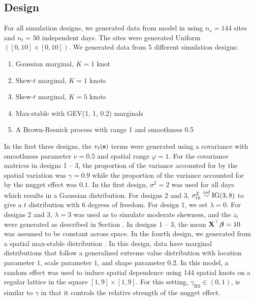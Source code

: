 \documentclass[useAMS,usenatbib,referee]{biom}
\begin{document}
\subsection{Design}\label{sts:simdesign}
For all simulation designs, we generated data from model  in  using $n_s=144$ sites and $n_t=50$ independent days.
The sites were generated Uniform$([0, 10] \times [0, 10])$.
We generated data from 5 different simulation designs:
\begin{enumerate}[leftmargin=3em]
  \item Gaussian marginal, $K=1$ knot
  \item Skew-$t$ marginal, $K=1$ knots
  \item Skew-$t$ marginal, $K=5$ knots
  \item Max-stable with GEV(1, 1, 0.2) marginals \citep{Reich2012}
  \item A Brown-Resnick process with range 1 and smoothness 0.5
\end{enumerate}
In the first three designs, the $v_t(\mbox{\bf s})$ terms were generated using a \Matern covariance with smoothness parameter $\nu = 0.5$ and spatial range $\varphi = 1$.
For the covariance matrices in designs 1 -- 3, the proportion of the variance accounted for by the spatial variation was $\gamma = 0.9$ while the proportion of the variance accounted for by the nugget effect was $0.1$.
In the first design, $\sigma^2 = 2$ was used for all days which results in a Gaussian distribution.
For designs 2 and 3, $\sigma^2_{tk} \stackrel{iid}{\sim} \text{IG}(3, 8)$ to give a $t$ distribution with 6 degrees of freedom.
For design 1, we set $\lambda = 0$.
For designs 2 and 3, $\lambda = 3$ was used as to simulate moderate skewness, and the $z_t$ were generated as described in Section .
In designs 1 -- 3, the mean $\mbox{\bf X}^\top \mbox{\boldmath $\beta$} = 10$ was assumed to be constant across space.
In the fourth design, we generated from a spatial max-stable distribution \citep{Reich2012}.
In this design, data have marginal distributions that follow a generalized extreme value distribution with location parameter $1$, scale parameter $1$, and shape parameter $0.2$.
In this model, a random effect was used to induce spatial dependence using 144 spatial knots on a regular lattice in the square $[1, 9] \times [1, 9]$.
For this setting, $\gamma_{\text{RS}} \in (0, 1)$, is similar to $\gamma$ in that it controls the relative strength of the nugget effect.
\end{document}

